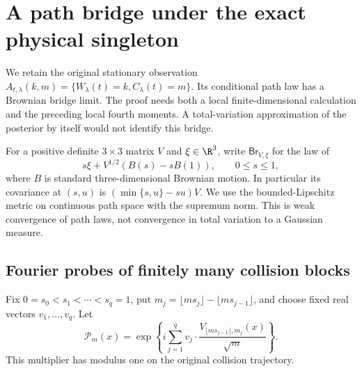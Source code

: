 \section{A path bridge under the exact physical singleton}
\label{sec:v36-exact-path-bridge}
We retain the original stationary observation
$A_{t,\lambda}(k,m)=\{W_\lambda(t)=k,C_\lambda(t)=m\}$.
Its conditional path law has a Brownian bridge limit. The proof needs
both a local finite-dimensional calculation and the preceding local
fourth moments. A total-variation approximation of the posterior by
itself would not identify this bridge.

For a positive definite $3\times3$ matrix $V$ and $\xi\in\R^3$,
write $\mathsf{Br}_{V,\xi}$ for the law of
\begin{equation}\label{eq:v36-bridge-definition}
 s\xi+V^{1/2}(B(s)-sB(1)),\qquad 0\le s\le1,
\end{equation}
where $B$ is standard three-dimensional Brownian motion. In particular
its covariance at $(s,u)$ is $(\min\{s,u\}-su)V$. We use the
bounded-Lipschitz metric on continuous path space with the supremum
norm. This is weak convergence of path laws, not convergence in total
variation to a Gaussian measure.

\subsection{Fourier probes of finitely many collision blocks}
Fix $0=s_0<s_1<\cdots<s_q=1$, put
$m_j=\lfloor ms_j\rfloor-\lfloor ms_{j-1}\rfloor$, and choose fixed
real vectors $v_1,\ldots,v_q$. Let
\[
 \mathcal P_m(x)=\exp\left\{i\sum_{j=1}^q
       v_j\cdot\frac{V_{\lfloor ms_{j-1}\rfloor,m_j}(x)}{\sqrt m}\right\}.
\]
This multiplier has modulus one on the original collision trajectory.

